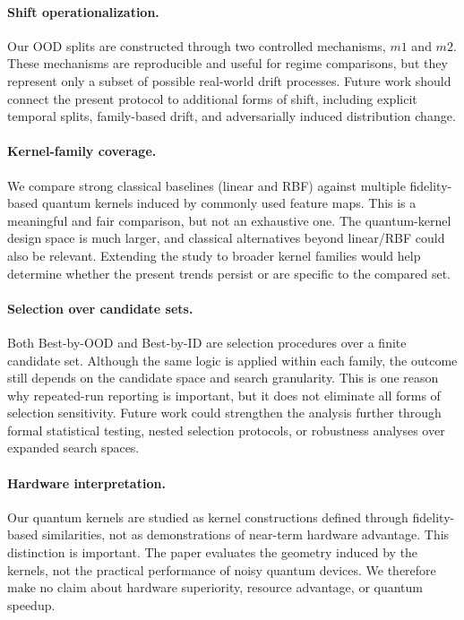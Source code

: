 \documentclass[pdflatex,sn-mathphys-num]{sn-jnl}%
\theoremstyle{thmstyleone}%
\theoremstyle{thmstyletwo}%
\theoremstyle{thmstylethree}%
\begin{document}
\paragraph{Shift operationalization.}
Our OOD splits are constructed through two controlled mechanisms, $m1$ and $m2$. These mechanisms are reproducible and useful for regime comparisons, but they represent only a subset of possible real-world drift processes. Future work should connect the present protocol to additional forms of shift, including explicit temporal splits, family-based drift, and adversarially induced distribution change.

\paragraph{Kernel-family coverage.}
We compare strong classical baselines (linear and RBF) against multiple fidelity-based quantum kernels induced by commonly used feature maps. This is a meaningful and fair comparison, but not an exhaustive one. The quantum-kernel design space is much larger, and classical alternatives beyond linear/RBF could also be relevant. Extending the study to broader kernel families would help determine whether the present trends persist or are specific to the compared set.

\paragraph{Selection over candidate sets.}
Both Best-by-OOD and Best-by-ID are selection procedures over a finite candidate set. Although the same logic is applied within each family, the outcome still depends on the candidate space and search granularity. This is one reason why repeated-run reporting is important, but it does not eliminate all forms of selection sensitivity. Future work could strengthen the analysis further through formal statistical testing, nested selection protocols, or robustness analyses over expanded search spaces.

\paragraph{Hardware interpretation.}
Our quantum kernels are studied as kernel constructions defined through fidelity-based similarities, not as demonstrations of near-term hardware advantage. This distinction is important. The paper evaluates the geometry induced by the kernels, not the practical performance of noisy quantum devices. We therefore make no claim about hardware superiority, resource advantage, or quantum speedup.
\end{document}
